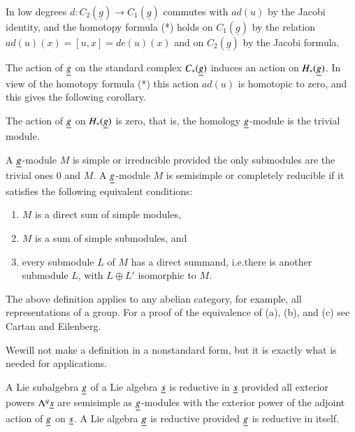 In low degrees $d:C_{2}(\underline{g})\to C_{1}(\underline{g})$
commutes with $ad(u)$ by the Jacobi identity, and the homotopy formula
(*) holds on $C_{1}(\underline{g})$ by the relation
$ad(u)(x)=[u,x]=de(u)(x)$ and on $C_{2}(\underline{g})$ by the Jacobi
formula. 

The action of $\underline{g}$ on the standard complex $C_{\ast}(\underline{g})$
induces an action on $H_{\ast}(\underline{g})$. In view of the homotopy
formula (*) this action $ad(u)$ is homotopic to zero, and this gives
the following corollary. 

\begin{corollary}\label{chap4-coro3.4}
The action of $\underline{g}$ on $H_{\ast}(\underline{g})$ is zero, that is, the
homology $\underline{g}$-module is the trivial module.
\end{corollary}

\begin{definition}\label{chap4-defi3.5}
A $\underline{g}$-module $M$ is simple or irreducible provided the only
submodules are the trivial ones $0$ and $M$. A $\underline{g}$-module $M$ is
semisimple or completely reducible if it
satisfies the following equivalent conditions: 
\begin{enumerate}
\renewcommand{\theenumi}{\alph{enumi}}
\renewcommand{\labelenumi}{(\theenumi)}
\item $M$ is a direct sum of simple modules,

\item $M$ is a sum of simple submodules, and

\item every submodule $L$ of $M$ has a direct summand, i.e.\@ there is
  another submodule $L$, with $L\oplus L'$ isomorphic to $M$.
\end{enumerate}
\end{definition}

The above definition applies to any abelian category, for example, all
representations of a group. For a proof of the equivalence of (a),
(b), and (c) see Cartan and Eilenberg. 

We\pageoriginale will not make a definition in a nonstandard form, but
it is exactly what is needed for applications.

\begin{definition}\label{chap4-defi3.6}
A Lie subalgebra $\underline{g}$ of a Lie algebra $\underline{s}$ is reductive in
$\underline{s}$ provided all exterior powers $\Lambda^{q}\underline{s}$ are
semisimple as $\underline{g}$-modules with the exterior power of the adjoint
action of $\underline{g}$ on $\underline{s}$. A Lie algebra $\underline{g}$ is reductive
provided $\underline{g}$ is reductive in itself.
\end{definition}

